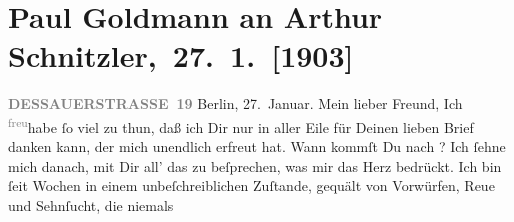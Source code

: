 

         
         \renewcommand{\erwaehntePersonen}{Personen: Paul Goldmann, Eduard Gutscher, Olga Schnitzler}
         \renewcommand{\erwaehnteInstitutionen}{Institutionen: Palasthotel Berlin}
         \renewcommand{\erwaehnteOrte}{Orte: Berlin, Dessauer Straße, Palasthotel Berlin, Wien}
         \renewcommand{\erwaehnteWerke}{}
               \section[ Paul Goldmann an Arthur Schnitzler, 27. 1. {[}1903{]}]{ Paul Goldmann an Arthur Schnitzler, 27. 1. {[}1903{]}}\nopagebreak{}\rehead{ }\begin{ledgroupsized}[t]{13cm}\normalsize\beginnumbering{} \toendnotes[C]{\smallbreak\pagebreak[2]} 
\toendnotes[C]{\smallbreak}\pstart
           \noindent{}\raggedleft{}{\pb}\textcolor{gray}{\textbf{DESSAUERSTRASSE 19}}\pend
           \pstart
           Berlin, 27. Januar.\pend
           \pstart\center{}Mein lieber Freund,\pend\pstart
           Ich \substVorne{}\textsuperscript{\textcolor{gray}{freu}}\substDazwischen{}habe\substHinten{} ſo viel zu thun, daß ich Dir nur in aller Eile für Deinen lieben Brief
               danken kann, der mich unendlich erfreut hat. Wann kommſt Du nach \label{K_L03361-1v}\label{K_L03361-1h}? Ich ſehne mich danach, mit
               Dir all’ das zu beſprechen, was mir das Herz bedrückt. Ich bin ſeit Wochen in einem
               unbeſchreiblichen Zuſtande, gequält von Vorwürfen, Reue und Sehnſucht, die niemals

\end{ledgroupsized}
